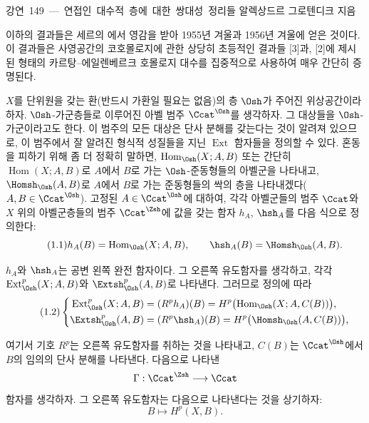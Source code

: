 \unit{강연 149 — 연접인 대수적 층에 대한 쌍대성 정리들}
%
  {알렉상드르 그로텐디크 지음}

이하의 결과들은 세르의 에서 영감을 받아
1955년 겨울과 1956년 겨울에 얻은 것이다. 이 결과들은 사영공간의
코호몰로지에 관한 상당히 초등적인 결과들 [3]과,
[2]에 제시된 형태의 카르탕--에일렌베르크 호몰로지 대수를 집중적으로
사용하여 매우 간단히 증명된다.


$X$를 단위원을 갖는 환(반드시 가환일 필요는 없음)의 층 $\Osh$가 주어진
위상공간이라 하자. $\Osh$-가군층들로 이루어진 아벨 범주
$\Ccat^{\Osh}$를 생각하자. 그 대상들을 $\Osh$-가군이라고도 한다.
이 범주의 모든 대상은 단사 분해를 갖는다는 것이 알려져 있으므로, 이 범주에서
잘 알려진 형식적 성질들을 지닌 $\operatorname{Ext}$ 함자들을 정의할 수
있다. 혼동을 피하기 위해 좀 더 정확히 말하면,
$\operatorname{Hom}_{\Osh}(X;A,B)$ 또는 간단히
$\operatorname{Hom}(X;A,B)$로 $A$에서 $B$로 가는 $\Osh$-준동형들의 아벨군을
나타내고, $\Homsh_{\Osh}(A,B)$로 $A$에서 $B$로 가는 준동형들의
싹의 층을 나타내겠다($A,B\in\Ccat^{\Osh}$). 고정된
$A\in\Ccat^{\Osh}$에 대하여, 각각 아벨군들의 범주
$\Ccat$와 $X$ 위의 아벨군층들의 범주
$\Ccat^{\Zsh}$에 값을 갖는 함자 $h_A$, $\hsh_A$를 다음 식으로 정의한다:
\begin{equation}\tag{1.1}
  h_A(B)=\operatorname{Hom}_{\Osh}(X;A,B),
  \qquad
  \hsh_A(B)=\Homsh_{\Osh}(A,B).
\end{equation}

$h_A$와 $\hsh_A$는 공변 왼쪽 완전 함자이다.
그 오른쪽 유도함자를 생각하고, 각각
$\operatorname{Ext}_{\Osh}^{p}(X;A,B)$와 $\Extsh_{\Osh}^{p}(A,B)$로 나타낸다. 그러므로
정의에 따라
\begin{equation}\tag{1.2}
\left\{
\begin{aligned}
\operatorname{Ext}_{\Osh}^{p}(X;A,B)
  &= (R^{p}h_A)(B)
   = H^{p}\bigl(\operatorname{Hom}_{\Osh}(X;A,C(B))\bigr),\\
\Extsh_{\Osh}^{p}(A,B)
  &= (R^{p}\hsh_A)(B)
   = H^{p}\bigl(\Homsh_{\Osh}(A,C(B))\bigr),
\end{aligned}
\right.
\end{equation}

여기서 기호 $R^{p}$는 오른쪽 유도함자를 취하는 것을 나타내고,
$C(B)$는 $\Ccat^{\Osh}$에서 $B$의 임의의 단사 분해를 나타낸다.
다음으로 나타낸
\[
  \Gamma:\Ccat^{\Zsh}\longrightarrow\Ccat
\]
 함자를 생각하자. 그 오른쪽 유도함자는 다음으로
나타낸다는 것을 상기하자:
\[
  B\longmapsto H^{p}(X,B).
\]


